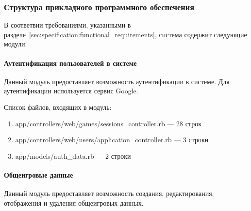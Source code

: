 \subsubsection{Структура прикладного программного обеспечения}

В соответвии требованиями, указанными в разделе~\ref{sec:specification:functional_requirements}, система содержит следующие модули:
\paragraph{Аутентификация пользователей в системе}

Данный модуль предоставляет возможность аутентификации в системе. Для аутентификации используется сервис Google.

Список файлов, входящих в модуль:
\begin{enumerate}[label=\arabic*)]
\item app/controllers/web/games/sessions\_controller.rb --- 28 строк
\item app/controllers/web/users/application\_controller.rb --- 3 строки
\item app/models/auth\_data.rb --- 2 строки
\end{enumerate}


\paragraph{Общеигровые данные}

Данный модуль предоставляет возможность создания, редактирования, отображения и удаления общеигровых данных.


